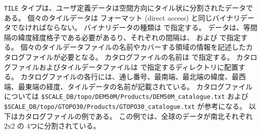 \verb|TILE| タイプは、ユーザ定義データは空間方向にタイル状に分割されたデータである。
個々のタイルデータは \grads フォーマット (direct access) と同じバイナリデータでなければならない。
バイナリデータの種類は  で指定する。
データは、等間隔の緯度経度格子である必要があるり、それぞれの間隔は、 および  で指定する。
個々のタイルデータファイルの名前やカバーする領域の情報を記述したカタログファイルが必要となる。
カタログファイルの名前は  で指定する。
カタログファイルおよびタイルデータファイルは  で指定するディレクトリに配置する。
カタログファイルの各行には、通し番号、最南端、最北端の緯度、最西端、最東端の経度、タイルデータの名前が記載されている。
カタログファイルについては \verb|$SCALE_DB/topo/DEM50M/Products/DEM50M_catalogue.txt| および \verb|$SCALE_DB/topo/GTOPO30/Products/GTOPO30_catalogue.txt| が参考になる。
以下はカタログファイルの例である。
この例では、全球のデータが南北それぞれ 2x2 の 4つに分割されている。

